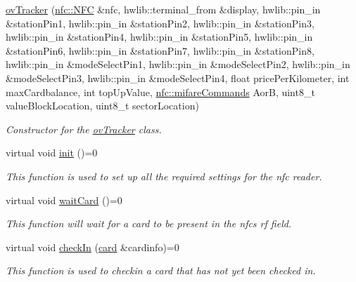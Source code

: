 \begin{DoxyCompactItemize}
\item 
\hyperlink{classovTracker_a040c753cf8d2bce0921cb9996738b66c}{ov\+Tracker} (\hyperlink{classnfc_1_1NFC}{nfc\+::\+N\+FC} \&nfc, hwlib\+::terminal\+\_\+from \&display, hwlib\+::pin\+\_\+in \&station\+Pin1, hwlib\+::pin\+\_\+in \&station\+Pin2, hwlib\+::pin\+\_\+in \&station\+Pin3, hwlib\+::pin\+\_\+in \&station\+Pin4, hwlib\+::pin\+\_\+in \&station\+Pin5, hwlib\+::pin\+\_\+in \&station\+Pin6, hwlib\+::pin\+\_\+in \&station\+Pin7, hwlib\+::pin\+\_\+in \&station\+Pin8, hwlib\+::pin\+\_\+in \&mode\+Select\+Pin1, hwlib\+::pin\+\_\+in \&mode\+Select\+Pin2, hwlib\+::pin\+\_\+in \&mode\+Select\+Pin3, hwlib\+::pin\+\_\+in \&mode\+Select\+Pin4, float price\+Per\+Kilometer, int max\+Cardbalance, int top\+Up\+Value, \hyperlink{declarations_8h_a305b1a3bcfca65e2a82f0f9d24676835}{nfc\+::mifare\+Commands} AorB, uint8\+\_\+t value\+Block\+Location, uint8\+\_\+t sector\+Location)
\begin{DoxyCompactList}\small\item\em Constructor for the \hyperlink{classovTracker}{ov\+Tracker} class. \end{DoxyCompactList}\item 
\mbox{\label{classovTracker_aa12f6c32a67e9a00d4b733963c54b443}} 
virtual void \hyperlink{classovTracker_aa12f6c32a67e9a00d4b733963c54b443}{init} ()=0
\begin{DoxyCompactList}\small\item\em This function is used to set up all the required settings for the nfc reader. \end{DoxyCompactList}\item 
virtual void \hyperlink{classovTracker_a43dea6c5e524377f2190e59a7da85b51}{wait\+Card} ()=0
\begin{DoxyCompactList}\small\item\em This function will wait for a card to be present in the nfc\textquotesingle{}s rf field. \end{DoxyCompactList}\item 
virtual void \hyperlink{classovTracker_a1d5cd8f5a6bd02c91d6d010f1a3839ce}{check\+In} (\hyperlink{classcard}{card} \&cardinfo)=0
\begin{DoxyCompactList}\small\item\em This function is used to checkin a card that has not yet been checked in. \end{DoxyCompactList}\item 

\end{DoxyCompactItemize}
